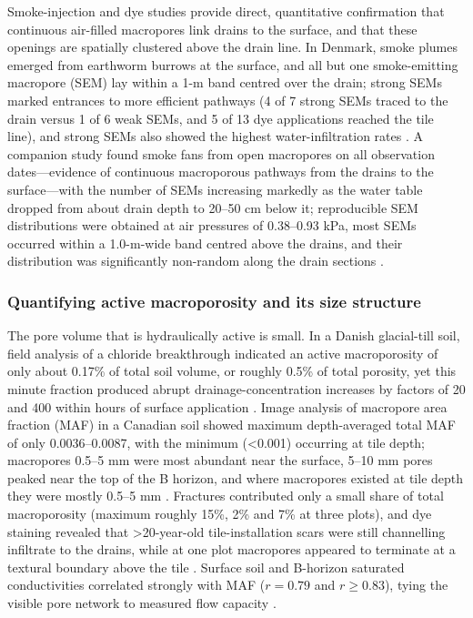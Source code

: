 \documentclass[11pt]{article}
\begin{document}
Smoke-injection and dye studies provide direct, quantitative confirmation that
continuous air-filled macropores link drains to the surface, and that these openings
are spatially clustered above the drain line. In Denmark, smoke plumes emerged from
earthworm burrows at the surface, and all but one smoke-emitting macropore (SEM) lay
within a 1-m band centred over the drain; strong SEMs marked entrances to more
efficient pathways (4 of 7 strong SEMs traced to the drain versus 1 of 6 weak SEMs,
and 5 of 13 dye applications reached the tile line), and strong SEMs also showed the
highest water-infiltration rates \parencite{Nielsen2015}. A companion study found
smoke fans from open macropores on all observation dates---evidence of continuous
macroporous pathways from the drains to the surface---with the number of SEMs
increasing markedly as the water table dropped from about drain depth to 20--50 cm
below it; reproducible SEM distributions were obtained at air pressures of 0.38--0.93
kPa, most SEMs occurred within a 1.0-m-wide band centred above the drains, and their
distribution was significantly non-random along the drain sections
\parencite{Petersen2012}.

\subsubsection{Quantifying active macroporosity and its size structure}

The pore volume that is hydraulically active is small. In a Danish glacial-till soil,
field analysis of a chloride breakthrough indicated an active macroporosity of only
about 0.17\% of total soil volume, or roughly 0.5\% of total porosity, yet this
minute fraction produced abrupt drainage-concentration increases by factors of 20 and
400 within hours of surface application \parencite{Villholth1998}. Image analysis of
macropore area fraction (MAF) in a Canadian soil showed maximum depth-averaged total
MAF of only 0.0036--0.0087, with the minimum (\textless 0.001) occurring at tile
depth; macropores 0.5--5 mm were most abundant near the surface, 5--10 mm pores
peaked near the top of the B horizon, and where macropores existed at tile depth they
were mostly 0.5--5 mm \parencite{Frey2011}. Fractures contributed only a small share
of total macroporosity (maximum roughly 15\%, 2\% and 7\% at three plots), and
dye staining revealed that \textgreater 20-year-old tile-installation scars were
still channelling infiltrate to the drains, while at one plot macropores appeared to
terminate at a textural boundary above the tile \parencite{Frey2011}. Surface soil
and B-horizon saturated conductivities correlated strongly with MAF ($r = 0.79$ and
$r \geq 0.83$), tying the visible pore network to measured flow capacity
\parencite{Frey2011}.
\end{document}
